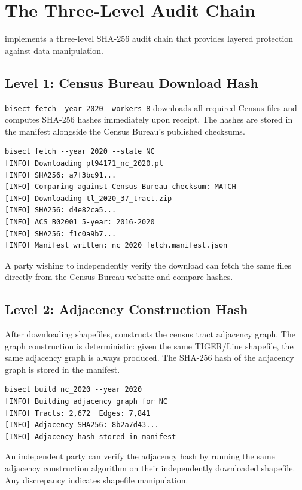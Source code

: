 \section{The Three-Level Audit Chain}
\label{sec:audit-chain}

\bisect{} implements a three-level SHA-256 audit chain that provides
layered protection against data manipulation.

\subsection{Level 1: Census Bureau Download Hash}

\texttt{bisect fetch --year 2020 --workers 8} downloads all required
Census files and computes SHA-256 hashes immediately upon receipt.
The hashes are stored in the manifest alongside the Census Bureau's
published checksums.

\begin{verbatim}
bisect fetch --year 2020 --state NC
[INFO] Downloading pl94171_nc_2020.pl
[INFO] SHA256: a7f3bc91...
[INFO] Comparing against Census Bureau checksum: MATCH
[INFO] Downloading tl_2020_37_tract.zip
[INFO] SHA256: d4e82ca5...
[INFO] ACS B02001 5-year: 2016-2020
[INFO] SHA256: f1c0a9b7...
[INFO] Manifest written: nc_2020_fetch.manifest.json
\end{verbatim}

A party wishing to independently verify the download can fetch the
same files directly from the Census Bureau website and compare hashes.

\subsection{Level 2: Adjacency Construction Hash}

After downloading shapefiles, \bisect{} constructs the census tract
adjacency graph.
The graph construction is deterministic: given the same TIGER/Line shapefile,
the same adjacency graph is always produced.
The SHA-256 hash of the adjacency graph is stored in the manifest.

\begin{verbatim}
bisect build nc_2020 --year 2020
[INFO] Building adjacency graph for NC
[INFO] Tracts: 2,672  Edges: 7,841
[INFO] Adjacency SHA256: 8b2a7d43...
[INFO] Adjacency hash stored in manifest
\end{verbatim}

An independent party can verify the adjacency hash by running the same
adjacency construction algorithm on their independently downloaded shapefile.
Any discrepancy indicates shapefile manipulation.

